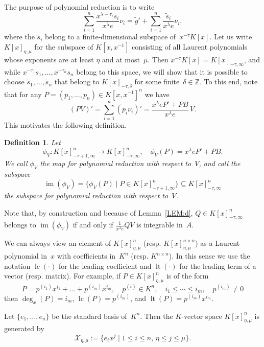 \documentclass[final,1p,times,authoryear]{elsarticle}
\newtheorem{defi}[theorem]{Definition}
\newcommand{\cX}{ {\mathcal X}}
\let\set\mathbb
\def\lc{\operatorname{lc}}
\def\lt{\operatorname{lt}}
\def\im{\operatorname{im}}
\begin{document}
The purpose of polynomial reduction is to write
\[
  \sum_{i=1}^n\frac{x^{\lambda-\tau_i}s_i}{x^{\lambda}e}\nu_i=\tilde g'+
  \sum_{i=1}^n\frac{\tilde s_i}{x^\lambda e}\nu_i,
\]
where the $\tilde s_i$ belong to a finite-dimensional subspace of~$x^{-\tau}K[x]$.
Let us write $K[x]_{\eta,\mu}$ for the subspace of $K[x,x^{-1}]$ consisting of all Laurent polynomials
whose exponents are at least $\eta$ and at most~$\mu$. Then $x^{-\tau}K[x]=K[x]_{-\tau,\infty}$, and
while $x^{-\tau_1}s_1,\dots,x^{-\tau_n}s_n$ belong to this space, we will show that it is possible to
choose $\tilde s_1,\dots,\tilde s_n$ that belong to $K[x]_{-\tau,\delta}$ for some finite~$\delta\in\set Z$.
To this end, note that for any $P = (p_1, \ldots, p_n)\in K[x,x^{-1}]^n$ we have
\begin{equation} \label{EQ:polyred}
  (PV)' = \sum_{i=1}^n (p_i \nu_i)' = \frac{x^\lambda eP' + PB}{x^\lambda e}\,V.
\end{equation}
This motivates the following definition.

\begin{defi}
  Let 
  \[
    \phi_V\colon K[x]_{-\tau+1,\infty}^n \to K[x]_{-\tau,\infty}^n,\quad
    \phi_V(P) = x^\lambda eP' + PB.
  \]
  We call $\phi_V$ the \emph{map for polynomial reduction} with respect to~$V$, and call
  the subspace
\[
 \im(\phi_V) = \bigl\{\phi_V(P) \mid P \in K[x]_{-\tau+1,\infty}^n\bigr\}\subseteq K[x]_{-\tau,\infty}^n
\]
the \emph{subspace for polynomial reduction} with respect to~$V$.
\end{defi}

Note that, by construction and because of Lemma~\ref{LEM:d}, $Q\in K[x]_{-\tau,\infty}^n$ belongs to
$\im(\phi_V)$ if and only if $\frac{1}{x^\lambda e}QV$ is integrable in~$A$. 

We can always view an element of $K[x]_{\eta,\mu}^n$ (resp. $K[x]_{\eta,\mu}^{n\times n}$) as a Laurent polynomial in~$x$
with coefficients in~$K^n$ (resp. $K^{n\times n}$). In this sense we use the notation $\lc(\cdot)$
for the leading coefficient and $\lt(\cdot)$ for the leading term of a vector (resp. matrix).
For example, if $P\in K[x]_{\eta,\mu}^n$ is of the form
\[
  P = p^{(i_1)}x^{i_1} + \dots + p^{(i_m)}x^{i_m},\quad p^{(i)}\in K^n,\quad i_1\leq\cdots\leq i_m,\quad p^{(i_m)}\neq0
\]
then $\deg_x(P)=i_m$, $\lc(P)=p^{(i_m)}$, and $\lt(P)=p^{(i_m)}x^{i_m}$.

Let $\{e_1, \ldots, e_n\}$ be the standard basis of~$K^n$.
Then the $K$-vector space $K[x]_{\eta,\mu}^n$ is generated by
\[
  \cX_{\eta,\mu}:= \bigl\{e_ix^j \mathrel{|} 1\leq i \leq n,\, \eta\leq j\leq \mu\bigr\}.
\]
\end{document}
